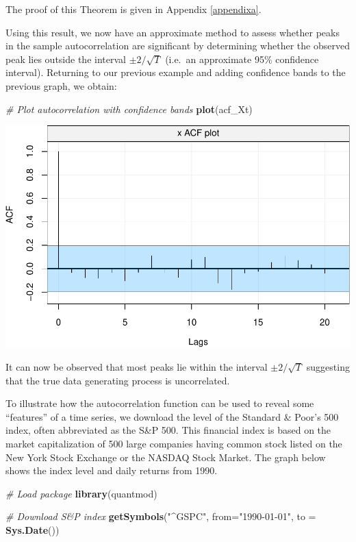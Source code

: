 \documentclass[]{book}
\newenvironment{Shaded}{\begin{snugshade}}{\end{snugshade}}
\newcommand{\KeywordTok}[1]{\textcolor[rgb]{0.13,0.29,0.53}{\textbf{#1}}}
\newcommand{\DataTypeTok}[1]{\textcolor[rgb]{0.13,0.29,0.53}{#1}}
\newcommand{\StringTok}[1]{\textcolor[rgb]{0.31,0.60,0.02}{#1}}
\newcommand{\CommentTok}[1]{\textcolor[rgb]{0.56,0.35,0.01}{\textit{#1}}}
\newcommand{\NormalTok}[1]{#1}
\theoremstyle{definition}
\theoremstyle{definition}
\theoremstyle{definition}
\theoremstyle{remark}
\let\BeginKnitrBlock\begin \let\EndKnitrBlock\end
\begin{document}
The proof of this Theorem is given in Appendix \ref{appendixa}.

Using this result, we now have an approximate method to assess whether
peaks in the sample autocorrelation are significant by determining
whether the observed peak lies outside the interval \(\pm 2/\sqrt{T}\)
(i.e.~an approximate 95\% confidence interval). Returning to our
previous example and adding confidence bands to the previous graph, we
obtain:

\begin{Shaded}
\begin{Highlighting}[]
\CommentTok{# Plot autocorrelation with confidence bands }
\KeywordTok{plot}\NormalTok{(acf_Xt)}
\end{Highlighting}
\end{Shaded}

\includegraphics{ts_files/figure-latex/basicACF2-1.pdf}

It can now be observed that most peaks lie within the interval
\(\pm 2/\sqrt{T}\) suggesting that the true data generating process is
uncorrelated.

\BeginKnitrBlock{example}
\protect\hypertarget{exm:acffeatures}{}{\label{exm:acffeatures} }To
illustrate how the autocorrelation function can be used to reveal some
``features'' of a time series, we download the level of the Standard \&
Poor's 500 index, often abbreviated as the S\&P 500. This financial
index is based on the market capitalization of 500 large companies
having common stock listed on the New York Stock Exchange or the NASDAQ
Stock Market. The graph below shows the index level and daily returns
from 1990.
\EndKnitrBlock{example}

\begin{Shaded}
\begin{Highlighting}[]
\CommentTok{# Load package}
\KeywordTok{library}\NormalTok{(quantmod)}

\CommentTok{# Download S&P index}
\KeywordTok{getSymbols}\NormalTok{(}\StringTok{"^GSPC"}\NormalTok{, }\DataTypeTok{from=}\StringTok{"1990-01-01"}\NormalTok{, }\DataTypeTok{to =} \KeywordTok{Sys.Date}\NormalTok{())}
\end{Highlighting}
\end{Shaded}
\end{document}

